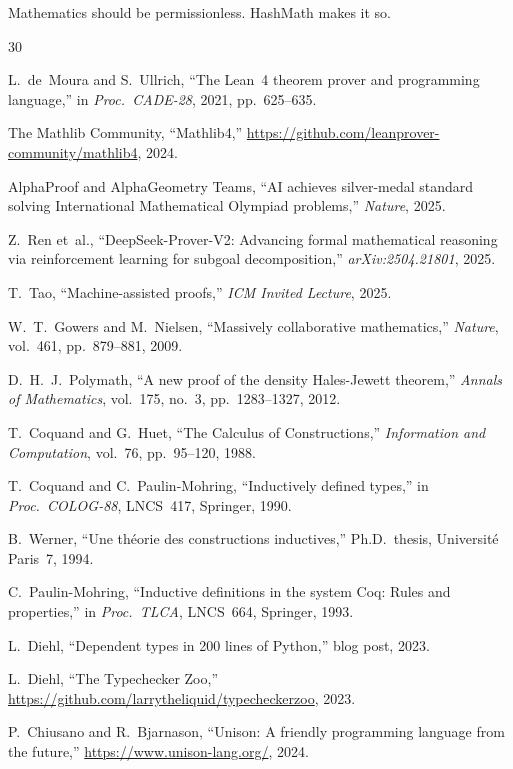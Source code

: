 \documentclass[11pt]{article}
\theoremstyle{definition}
\theoremstyle{plain}
\theoremstyle{remark}
\begin{document}
Mathematics should be permissionless.
HashMath makes it so.

\bigskip

\begin{thebibliography}{30}

L.~de~Moura and S.~Ullrich,
``The Lean~4 theorem prover and programming language,''
in \emph{Proc.\ CADE-28}, 2021, pp.~625--635.

The Mathlib Community,
``Mathlib4,''
\url{https://github.com/leanprover-community/mathlib4}, 2024.

AlphaProof and AlphaGeometry Teams,
``AI achieves silver-medal standard solving International Mathematical Olympiad problems,''
\emph{Nature}, 2025.

Z.~Ren et~al.,
``DeepSeek-Prover-V2: Advancing formal mathematical reasoning via reinforcement learning for subgoal decomposition,''
\emph{arXiv:2504.21801}, 2025.

T.~Tao,
``Machine-assisted proofs,''
\emph{ICM Invited Lecture}, 2025.

W.~T.~Gowers and M.~Nielsen,
``Massively collaborative mathematics,''
\emph{Nature}, vol.~461, pp.~879--881, 2009.

D.~H.~J.~Polymath,
``A new proof of the density Hales-Jewett theorem,''
\emph{Annals of Mathematics}, vol.~175, no.~3, pp.~1283--1327, 2012.

T.~Coquand and G.~Huet,
``The Calculus of Constructions,''
\emph{Information and Computation}, vol.~76, pp.~95--120, 1988.

T.~Coquand and C.~Paulin-Mohring,
``Inductively defined types,''
in \emph{Proc.\ COLOG-88}, LNCS~417, Springer, 1990.

B.~Werner,
``Une th\'eorie des constructions inductives,''
Ph.D.\ thesis, Universit\'e Paris~7, 1994.

C.~Paulin-Mohring,
``Inductive definitions in the system Coq: Rules and properties,''
in \emph{Proc.\ TLCA}, LNCS~664, Springer, 1993.

L.~Diehl,
``Dependent types in 200 lines of Python,''
blog post, 2023.

L.~Diehl,
``The Typechecker Zoo,''
\url{https://github.com/larrytheliquid/typecheckerzoo}, 2023.

P.~Chiusano and R.~Bjarnason,
``Unison: A friendly programming language from the future,''
\url{https://www.unison-lang.org/}, 2024.


\end{thebibliography}
\end{document}
